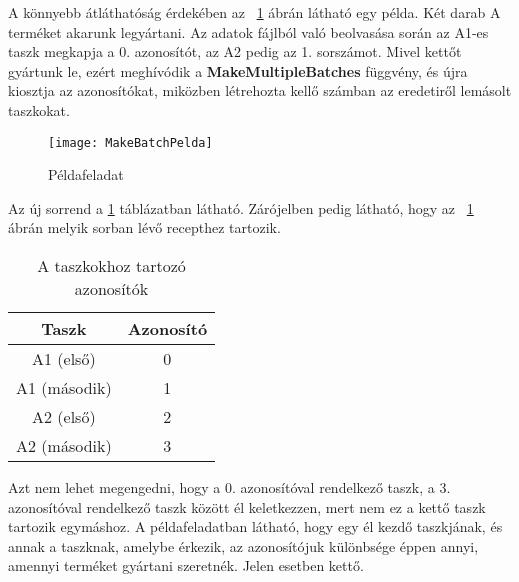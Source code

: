 A könnyebb átláthatóság érdekében az ~\ref{MakeBatchPelda} ábrán látható egy példa. Két darab A terméket akarunk legyártani. Az adatok fájlból való beolvasása során az A1-es taszk megkapja a 0. azonosítót, az A2 pedig az 1. sorszámot. Mivel kettőt gyártunk le, ezért meghívódik a \textbf{MakeMultipleBatches} függvény, és újra kiosztja az azonosítókat, miközben létrehozta kellő számban az eredetiről lemásolt taszkokat. 
\begin{figure}[H]
\begin{center}
\texttt{[image: MakeBatchPelda]}
\caption{Példafeladat}
\label{MakeBatchPelda}
\end{center}
\end{figure}
Az új sorrend a \ref{tab:table1} táblázatban látható. Zárójelben pedig látható, hogy az ~\ref{MakeBatchPelda} ábrán melyik sorban lévő recepthez tartozik.
\begin{table}[H]
  \begin{center}
  	\caption{A taszkokhoz tartozó azonosítók}
  	\captionsetup[table]{skip=10pt}
    \label{tab:table1}
    \begin{tabular}{|c|c|}
      \textbf{Taszk} & \textbf{Azonosító} \\     
      \hline
      A1 (első) & 0\\
      A1 (második) & 1\\
      A2 (első) & 2\\
      A2 (második) & 3\\
    \end{tabular}
  \end{center}
\end{table}
Azt nem lehet megengedni, hogy a 0. azonosítóval rendelkező taszk, a 3. azonosítóval rendelkező taszk között él keletkezzen, mert nem ez a kettő taszk tartozik egymáshoz. A példafeladatban látható, hogy egy él kezdő taszkjának, és annak a taszknak, amelybe érkezik, az azonosítójuk különbsége éppen annyi, amennyi terméket gyártani szeretnék. Jelen esetben kettő. 


